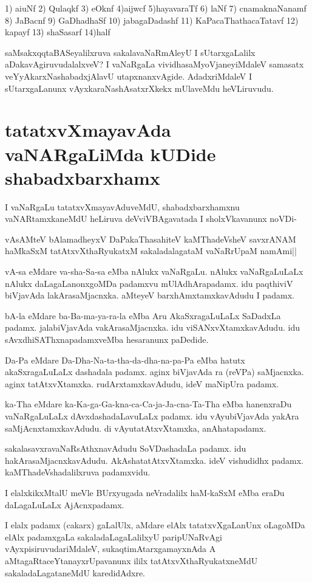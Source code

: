 1) aiuNf  2) Qulaqkf 3) eOknf 4)aijwcf 5)hayavaraTf 6) laNf  7) cnamaknaNanamf 8) JaBacnf    9) GaDhadhaSf
 10) jabagaDadashf 11) KaPacaThathacaTatavf 12) kapayf 13) shaSasarf 14)half
  
saMsakxqqtaBASeyalilxruva sakalavaNaRmAleyU I sUtarxgaLalilx aDakavAgiruvudalalxveV? I vaNaRgaLa vividhasaMyoVjaneyiMdaleV samasatx veYyAkarxNashabadxjAlavU utapxnanxvAgide. AdadxriMdaleV I sUtarxgaLanunx vAyxkaraNashAsatxrXkekx mUlaveMdu heVLiruvudu.

\section*{tatatxvXmayavAda vaNARgaLiMda kUDide shabadxbarxhamx}

I vaNaRgaLu tatatxvXmayavAduveMdU, shabadxbarxhamxnu vaNARtamxkaneMdU heLiruva deVviVBAgavatada I sholxVkavanunx noVDi-

\begin{shloka}
vAsAMteV bAlamadheyxV DaPakaThasahiteV kaMThadeVsheV savxrANAM\label{29}\\
haMkaSxM tatAtxvXthaRyukatxM sakaladalagataM vaNaRrUpaM namAmi||
\end{shloka}

vA-sa eMdare va-sha-Sa-sa eMba nAlukx vaNaRgaLu. nAlukx vaNaRgaLuLaLx nAlukx daLagaLanonxgoMDa padamxvu mUlAdhArapadamx. idu paqthiviV biVjavAda lakArasaMjacnxka. aMteyeV barxhAmxtamxkavAdudu I padamx.

bA-la eMdare ba-Ba-ma-ya-ra-la eMba Aru AkaSxragaLuLaLx SaDadxLa padamx. jalabiVjavAda vakArasaMjacnxka. idu viSANxvXtamxkavAdudu. idu sAvxdhiSAThxnapadamxveMba hesaranunx paDedide.

Da-Pa eMdare Da-Dha-Na-ta-tha-da-dha-na-pa-Pa eMba hatutx akaSxragaLuLaLx dashadala padamx. aginx biVjavAda ra (reVPa) saMjacnxka. aginx tatAtxvXtamxka. rudArxtamxkavAdudu, ideV maNipUra padamx.

ka-Tha eMdare ka-Ka-ga-Ga-kna-ca-Ca-ja-Ja-cna-Ta-Tha eMba hanenxraDu vaNaRgaLuLaLx dAvxdashadaLavuLaLx padamx. idu vAyubiVjavAda yakAra saMjAcnxtamxkavAdudu. di vAyutatAtxvXtamxka, anAhatapadamx. 

sakalasavxravaNaRsAthxnavAdudu SoVDashadaLa padamx. idu hakArasaMjacnxkavAdudu. AkAshatatAtxvXtamxka. ideV vishudidhx padamx. kaMThadeVshadalilxruva padamxvidu.

I elalxkikxMtalU meVle BUrxyugada neVradalilx haM-kaSxM eMba  eraDu daLagaLuLaLx AjAcnxpadamx.

I elalx padamx (cakarx) gaLalUlx, aMdare elAlx tatatxvXgaLanUnx oLagoMDa elAlx padamxgaLa sakaladaLagaLalilxyU paripUNaRvAgi vAyxpisiruvudariMdaleV, sukaqtimAtarxgamayxnAda A aMtagaRtaceYtanayxrUpavanunx ililx tatAtxvXthaRyukatxneMdU sakaladaLagataneMdU karedidAdxre.

